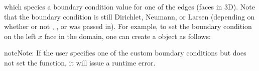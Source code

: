 \documentclass[letterpaper,10pt,english]{sphinxmanual}
\begin{document}
\sphinxAtStartPar
which species a boundary condition value for one of the edges (faces in 3D).
Note that the boundary condition  is still Dirichlet, Neumann, or Larsen (depending on whether or not , , or  was passed in).
For example, to set the boundary condition on the left \(x\) face in the domain, one can create a  object as follows:

\begin{sphinxVerbatim}[commandchars=\\\{\},formatcom=\scriptsize]
 

   \PYG{p}{[}\PYG{p}{]}        
    \PYG{p}{[}\PYG{p}{]}  

  
\end{sphinxVerbatim}

\begin{sphinxadmonition}{note}{Note:}
\sphinxAtStartPar
If the user specifies one of the custom boundary conditions but does not set the function, it will issue a run\sphinxhyphen{}time error.
\end{sphinxadmonition}
\end{document}
